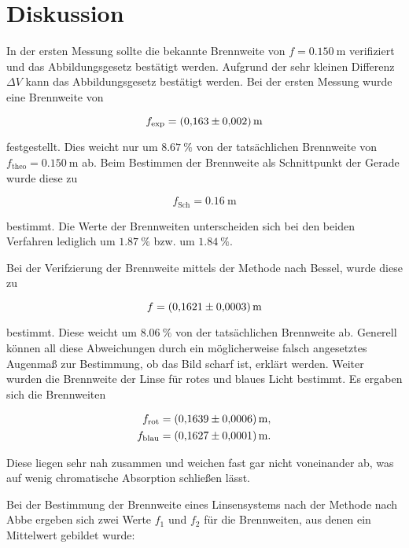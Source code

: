 \section{Diskussion}
\label{sec:Diskussion}

In der ersten Messung sollte die bekannte Brennweite von $f = \SI{0.150}{\meter}$ verifiziert und das 
Abbildungsgesetz bestätigt werden. Aufgrund der sehr kleinen Differenz $\Delta V$ kann das Abbildungsgesetz
bestätigt werden. Bei der ersten Messung wurde eine Brennweite von 

\begin{equation*}
f_\text{exp} = \SI{0.163+-0.002}{\meter}
\end{equation*}

festgestellt. Dies weicht nur um $\SI{8.67}{\percent}$ von der tatsächlichen Brennweite von 
$f_\text{theo}=\SI{0.150}{\meter}$ ab. Beim Bestimmen der Brennweite als Schnittpunkt der 
Gerade wurde diese zu 

\begin{equation*}
f_\text{Sch} = \SI{0.16}{\meter} 
\end{equation*}

bestimmt. Die Werte der Brennweiten unterscheiden sich bei den beiden Verfahren lediglich um 
$\SI{1.87}{\percent}$ bzw. um $\SI{1.84}{\percent}$. 

Bei der Verifzierung der Brennweite mittels der Methode nach Bessel, wurde diese zu 

\begin{equation*}
f = \SI{0.1621+-0.0003}{\meter}
\end{equation*}

bestimmt. Diese weicht um $\SI{8.06}{\percent}$ von der tatsächlichen Brennweite ab. Generell 
können all diese Abweichungen durch ein möglicherweise falsch angesetztes Augenmaß zur Bestimmung, ob das 
Bild scharf ist, erklärt werden. Weiter wurden die Brennweite der Linse für rotes und blaues Licht 
bestimmt. Es ergaben sich die Brennweiten

\begin{align*}
f_\text{rot} &= \SI{0.1639+-0.0006}{\meter},\\
f_\text{blau} & = \SI{0.1627+-0.0001}{\meter}.
\end{align*}

Diese liegen sehr nah zusammen und weichen fast gar nicht voneinander ab, was auf wenig chromatische 
Absorption schließen lässt. 

Bei der Bestimmung der Brennweite eines Linsensystems nach der Methode nach Abbe ergeben sich 
zwei Werte $f_1$ und $f_2$ für die Brennweiten, aus denen ein Mittelwert gebildet wurde:

